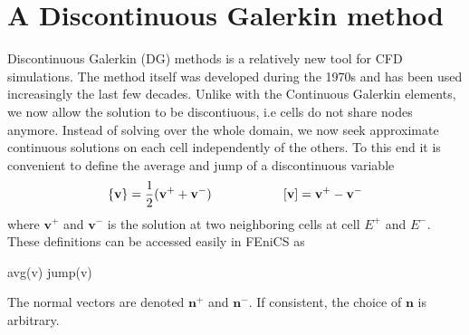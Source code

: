 \section{A Discontinuous Galerkin method}
Discontinuous Galerkin (DG) methods is a relatively new tool for CFD simulations. The method itself was developed during the 1970s and has been used increasingly the last few decades. Unlike with the Continuous Galerkin elements, we now allow the solution to be discontiuous, i.e cells do not share nodes anymore. Instead of solving over the whole domain, we now seek approximate continuous solutions on each cell independently of the others. To this end it is convenient to define the average and jump of a discontinuous variable
\begin{align} 
\{\mathbf{v}\} = \frac{1}{2}(\mathbf{v}^+ + \mathbf{v}^-) \hspace{2 cm}  [\mathbf{v}]  =  \mathbf{v}^+ - \mathbf{v}^- \label{Avg_jump}
\end{align}
where $\mathbf{v}^+$ and $\mathbf{v}^-$ is the solution at two neighboring cells at cell $E^+$ and $E^-$. These definitions can be accessed easily in FEniCS as
\begin{center}
\begin{cverbatim}
avg(v)
jump(v)
\end{cverbatim}
\end{center}
The normal vectors are denoted $\mathbf{n}^+$ and $\mathbf{n}^-$. If consistent, the choice of $\mathbf{n}$ is arbitrary. \cite{Rivi08}
